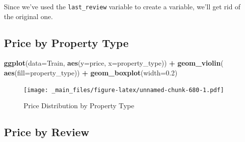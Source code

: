 \documentclass[]{book}
\newenvironment{Shaded}{\begin{snugshade}}{\end{snugshade}}
\newcommand{\KeywordTok}[1]{\textcolor[rgb]{0.13,0.29,0.53}{\textbf{#1}}}
\newcommand{\DataTypeTok}[1]{\textcolor[rgb]{0.13,0.29,0.53}{#1}}
\newcommand{\FloatTok}[1]{\textcolor[rgb]{0.00,0.00,0.81}{#1}}
\newcommand{\StringTok}[1]{\textcolor[rgb]{0.31,0.60,0.02}{#1}}
\newcommand{\CommentTok}[1]{\textcolor[rgb]{0.56,0.35,0.01}{\textit{#1}}}
\newcommand{\OperatorTok}[1]{\textcolor[rgb]{0.81,0.36,0.00}{\textbf{#1}}}
\newcommand{\NormalTok}[1]{#1}
\begin{document}
Since we've used the \texttt{last\_review} variable to create a
variable, we'll get rid of the original one.

\begin{Shaded}
\end{Shaded}

\subsection{Price by Property Type}\label{price-by-property-type}

\begin{Shaded}
\begin{Highlighting}[]
\KeywordTok{ggplot}\NormalTok{(}\DataTypeTok{data=}\NormalTok{Train, }\KeywordTok{aes}\NormalTok{(}\DataTypeTok{y=}\NormalTok{price, }\DataTypeTok{x=}\NormalTok{property_type)) }\OperatorTok{+}\StringTok{ }\KeywordTok{geom_violin}\NormalTok{( }\KeywordTok{aes}\NormalTok{(}\DataTypeTok{fill=}\NormalTok{property_type)) }\OperatorTok{+}\StringTok{ }
\StringTok{  }\KeywordTok{geom_boxplot}\NormalTok{(}\DataTypeTok{width=}\FloatTok{0.2}\NormalTok{)}
\end{Highlighting}
\end{Shaded}

\begin{figure}
\centering
\texttt{[image: \_main\_files/figure-latex/unnamed-chunk-680-1.pdf]}
\caption{\label{fig:unnamed-chunk-680}Price Distribution by Property Type}
\end{figure}

\subsection{Price by Review}\label{price-by-review}

\begin{Shaded}
\end{Shaded}
\end{document}
